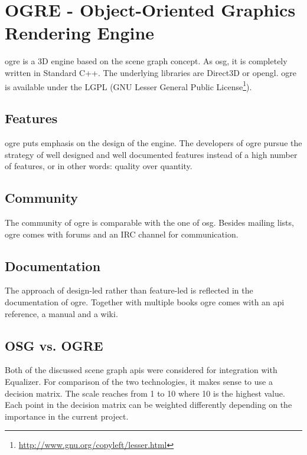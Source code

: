 \section{OGRE - Object-Oriented Graphics Rendering Engine}
\gls{ogre} \cite{website:ogreWeb} is a 3D engine based on the scene graph concept. As \gls{osg}, it is completely written in Standard C++. The underlying libraries are Direct3D or \gls{opengl}. \gls{ogre} is available under the LGPL (GNU Lesser General Public License\footnote{\href{http://www.gnu.org/copyleft/lesser.html}{http://www.gnu.org/copyleft/lesser.html}}).

\subsection{Features}
\gls{ogre} puts emphasis on the design of the engine. The developers of \gls{ogre} pursue the strategy of well designed and well documented features instead of a high number of features, or in other words: quality over quantity.

\subsection{Community}
The community of \gls{ogre} is comparable with the one of \gls{osg}. Besides mailing lists, \gls{ogre} comes with forums and an IRC channel for communication.

\subsection{Documentation}
The approach of design-led rather than feature-led is reflected in the documentation of \gls{ogre}. Together with multiple books \gls{ogre} comes with an \gls{api} reference, a manual and a wiki.


\subsection{OSG vs. OGRE}
Both of the discussed scene graph \glspl{api} were considered for integration with Equalizer. For comparison of the two technologies, it makes sense to use a decision matrix. The scale reaches from 1 to 10 where 10 is the highest value. Each point in the decision matrix can be weighted differently depending on the importance in the current project.

